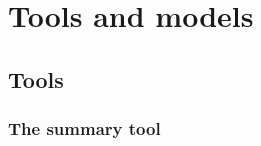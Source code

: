 \documentclass[11pt, a4paper]{article}
\newcommand{\bat}{{\sc BAT}}
\begin{document}


%


\clearpage
\pagebreak

\section{Tools and models}
\label{section:tools}

\subsection{Tools}
\label{subsection:tools}

\subsubsection{The summary tool}
\end{document}
